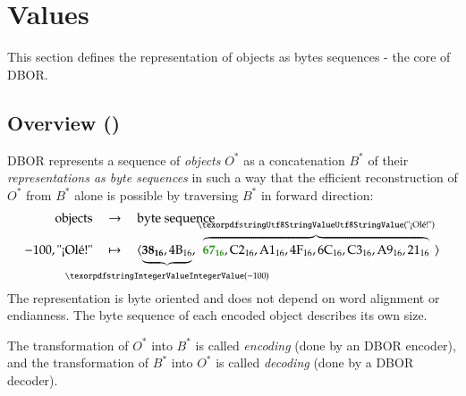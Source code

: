 
\section{Values}
\label{sec:values}

This section defines the representation of objects as bytes sequences - the core of DBOR.


\subsection{Overview (\DborValue)}
\hypertarget{sec:def:Value}{}

DBOR represents a sequence of \emph{objects} $O^*$ as a concatenation $B^*$ of their \emph{representations as byte
sequences} in such a way that the efficient reconstruction of $O^*$ from $B^*$ alone is possible by traversing $B^*$
in forward direction:
\begin{align*}
    \text{objects} & \quad\rightarrow\quad \text{byte sequence} \\[-2ex]
    -100, \text{"¡Olé!"}
        & \quad\mapsto\quad
    \ByteSequence{
        \underbrace{%
            \DborFirstByte\DborNumberValueColour{38}, \DborNextByte{4B}
        }_{\hskip-\textwidth\DborIntegerValue(-100)\hskip-\textwidth},
        \overbrace{%
            \DborFirstByte\DborStringValueColour{67},
            \DborNextByte{C2}, \DborNextByte{A1},
            \DborNextByte{4F}, \DborNextByte{6C},
            \DborNextByte{C3}, \DborNextByte{A9},
            \DborNextByte{21}
        }^{\DborUtfEightStringValue(\text{"¡Olé!"})}
    }
\end{align*}
The representation is byte oriented and does not depend on word alignment or endianness.
The byte sequence of each encoded object describes its own size.

\medskip
The transformation of $O^*$ into $B^*$ is called \emph{encoding} (done by an DBOR encoder),
and the transformation of $B^*$ into $O^*$ is called \emph{decoding} (done by a DBOR decoder).

